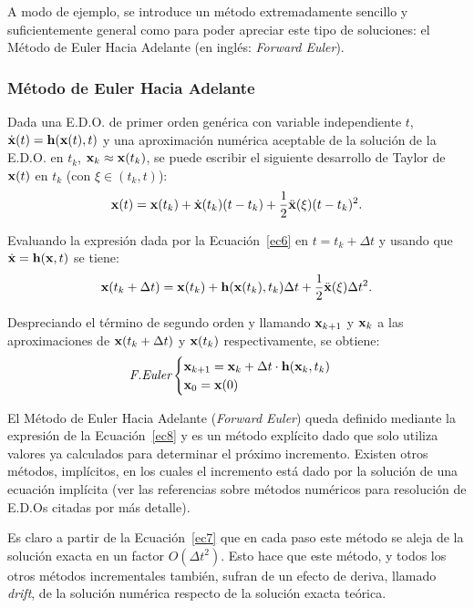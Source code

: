 A modo de ejemplo, se introduce un método extremadamente sencillo y suficientemente general como para poder apreciar este tipo de soluciones: el Método de Euler Hacia Adelante (en inglés: \textit{Forward Euler}).

\subsubsection{Método de Euler Hacia Adelante}\label{FEuler}

Dada una E.D.O. de primer orden genérica con variable independiente $t$, $\dot{{\bf x}}(t)={\bf h}({\bf x}(t),t)$ y una aproximación numérica aceptable de la solución de la E.D.O. en $t_k$, ${\bf x}_k\approx {\bf x}(t_k)$, se puede escribir el siguiente desarrollo de Taylor de ${\bf x}(t)$ en $t_k$ (con $\xi\in(t_k,t)$):
%
\begin{equation}\label{ec6}
{\bf x}(t)={\bf x}(t_k) + \dot{{\bf x}}(t_k)(t-t_k) + \frac{1}{2}\ddot{{\bf x}}(\xi)(t-t_k)^2.
\end{equation}

Evaluando la expresión dada por la Ecuación~\eqref{ec6} en $t=t_k+\Delta t$ y usando que $\dot{{\bf x}}={\bf h}({\bf x},t)$ se tiene:
%
\begin{equation}\label{ec7}
{\bf x}(t_k+\Delta t)={\bf x}(t_k) + {\bf h}({\bf x}(t_k),t_k)\Delta t + \frac{1}{2}\ddot{{\bf x}}(\xi)\Delta t^2.
\end{equation}

Despreciando el término de segundo orden y llamando ${\bf x}_{k+1}$ y ${\bf x}_k$ a las aproximaciones de ${\bf x}(t_k+\Delta t)$ y ${\bf x}(t_k)$ respectivamente, se obtiene:
%
\begin{equation}\label{ec8}
\textit{F.Euler}
	\begin{cases} 
	{\bf x}_{k+1}={\bf x}_k + \Delta t\cdot {\bf h}({\bf x}_k,t_k) \\
	{\bf x}_0={\bf x}(0)
	\end{cases}
\end{equation}

El Método de Euler Hacia Adelante (\textit{Forward Euler}) queda definido mediante la expresión de la Ecuación~\eqref{ec8} y es un método explícito dado que solo utiliza valores ya calculados para determinar el próximo incremento. %
%
Existen otros métodos, implícitos, en los cuales el incremento está dado por la solución de una ecuación implícita (ver las referencias sobre métodos numéricos para resolución de E.D.Os citadas por más detalle).

Es claro a partir de la Ecuación~\eqref{ec7} que en cada paso este método se aleja de la solución exacta en un factor $O(\Delta t^2)$. Esto hace que este método, y todos los otros métodos incrementales también, sufran de un efecto de deriva, llamado \textit{drift}, de la solución numérica respecto de la solución exacta teórica.

